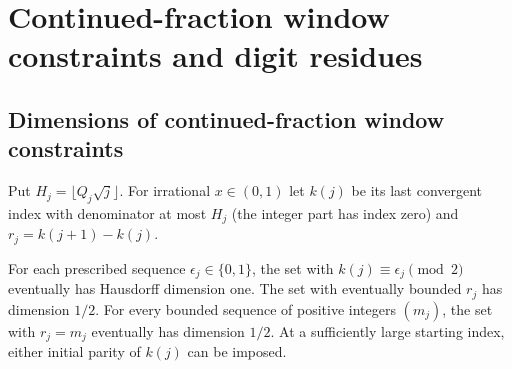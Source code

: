 \section{Continued-fraction window constraints and digit residues}\label{sec:windows-residues}

\subsection{Dimensions of continued-fraction window constraints}

Put $H_j=\lfloor Q_j\sqrt j\rfloor$. For irrational $x\in(0,1)$ let
$k(j)$ be its last convergent index with denominator at most $H_j$
(the integer part has index zero) and $r_j=k(j+1)-k(j)$.

\begin{theorem}\label{thm:windows}
For each prescribed sequence $\epsilon_j\in\{0,1\}$, the set with
$k(j)\equiv\epsilon_j\pmod2$ eventually has Hausdorff dimension one.
The set with eventually bounded $r_j$ has dimension $1/2$.
For every bounded sequence of positive integers $(m_j)$, the set
with $r_j=m_j$ eventually has dimension $1/2$. At a sufficiently
large starting index, either initial parity of $k(j)$ can be imposed.
\end{theorem}

